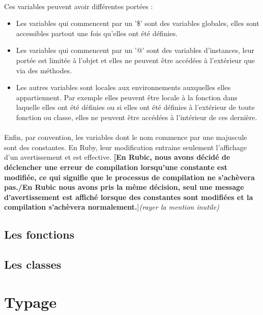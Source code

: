 \documentclass[12pt]{article}
\begin{document}
\paragraph{}
Ces variables peuvent avoir différentes portées :
\begin{itemize}
    \item Les variables qui commencent par un '\$' sont des variables
        globales, elles sont accessibles partout une fois qu'elles ont été
        définies.
    \item Les variables qui commencent par un '@' sont des variables
        d'instances, leur portée est limitée à l'objet et elles ne peuvent
        être accédées à l'extérieur que via des méthodes.
    \item Les autres variables sont locales aux environnements auxquelles
        elles appartiennent. Par exemple elles peuvent être locale à la
        fonction dans laquelle elles ont été définies ou si elles ont été
        définies à l'extérieur de toute fonction ou classe, elles ne peuvent
        être accédées à l'intérieur de ces dernière.
\end{itemize}

\paragraph{}
Enfin, par convention, les variables dont le nom commence par une majuscule
sont des constantes. En Ruby, leur modification entraine seulement l'affichage
d'un avertissement et est effective. \textbf{[En Rubic, nous avons décidé de
déclencher une erreur de compilation lorsqu'une constante est modifiée, ce qui
signifie que le processus de compilation ne s'achèvera pas.{\Large/}En
Rubic nous avons pris la même décision, seul une message d'avertissement est
affiché lorsque des constantes sont modifiées et la compilation s'achèvera
normalement.}]\emph{(rayer la mention inutile)}

\subsection{Les fonctions}

\subsection{Les classes}

\section{Typage}
\end{document}

